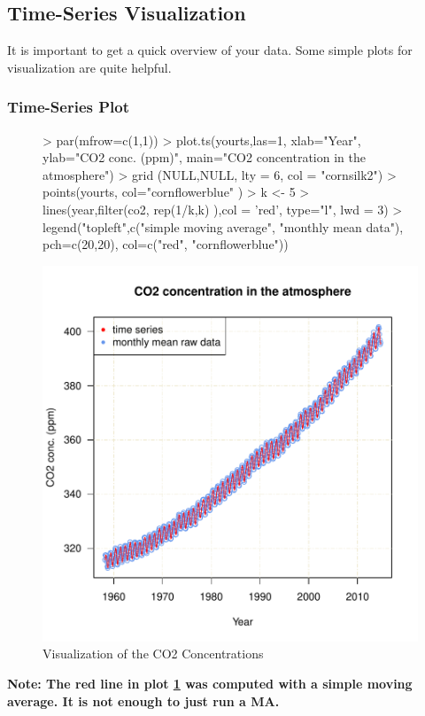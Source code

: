 \documentclass[11pt, a4paper]{article} %
\begin{document}
\subsection{Time-Series Visualization}%
It is important to get a quick overview of your data. Some simple plots for visualization are quite helpful.
\subsubsection{Time-Series Plot}
\begin{figure}[H]
\centering
\begin{Schunk}
\begin{Sinput}
> par(mfrow=c(1,1))
> plot.ts(yourts,las=1, xlab="Year", ylab="CO2 conc. (ppm)",
         main="CO2 concentration in the atmosphere")
> grid (NULL,NULL, lty = 6, col = "cornsilk2")
> points(yourts, col="cornflowerblue" )
> k <- 5
> lines(year,filter(co2, rep(1/k,k) ),col = 'red', type="l", lwd = 3)
> legend("topleft",c("simple moving average", "monthly mean data"),
 pch=c(20,20), col=c("red", "cornflowerblue"))
\end{Sinput}
\end{Schunk}
\includegraphics{alleselena-fig1visualize}
\caption{Visualization of the CO2 Concentrations}
\label{fig1visualize}
\end{figure}
\noindent \textbf{Note: The red line in plot \ref{fig1visualize} was computed with a simple moving average. It is not enough to just run a MA.}\\
\end{document}
